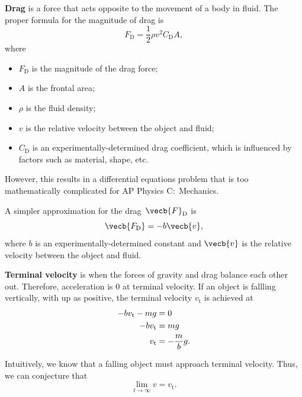 \textbf{Drag} is a force that acts opposite to the movement of a body in fluid.
The proper formula for the magnitude of drag is
\begin{equation}
    F_\mathrm{D} = \frac{1}{2} \rho v^2 C_\mathrm{D} A,
\end{equation}
where
\begin{itemize}
    \item \(F_\mathrm{D}\) is the magnitude of the drag force;
    \item \(A\) is the frontal area;
    \item \(\rho\) is the fluid density;
    \item \(v\) is the relative velocity between the object and fluid;
    \item \(C_\mathrm{D}\) is an experimentally-determined drag coefficient,
        which is influenced by factors such as material, shape, etc.
\end{itemize}
However, this results in a differential equations problem
that is too mathematically complicated for AP Physics C:~Mechanics.

A simpler approximation for the drag~\(\vecb{F}_\mathrm{D}\) is
\begin{equation} \label{eq:linear-drag}
    \vecb{F_\mathrm{D}} = - b \vecb{v},
\end{equation}
where \(b\) is an experimentally-determined constant
and \(\vecb{v}\) is the relative velocity between the object and fluid.

\textbf{Terminal velocity} is when the forces of gravity and drag
balance each other out.
Therefore, acceleration is 0 at terminal velocity.
If an object is fallling vertically, with up as positive,
the terminal velocity \(v_\mathrm{t}\) is achieved at
\begin{equation} \label{eq:linear-terminal-velocity}
    \begin{aligned}
        - b v_\mathrm{t} - m g &= 0 \\
        - b v_\mathrm{t} &= m g \\
        v_\mathrm{t} &= - \frac{m}{b} g. \\
    \end{aligned} \\
\end{equation}

Intuitively, we know that a falling object must approach terminal velocity.
Thus, we can conjecture that
\begin{equation} \label{eq:terminal-velocity-limit}
    \lim_{t \to \infty} v = v_\mathrm{t}.
\end{equation}

